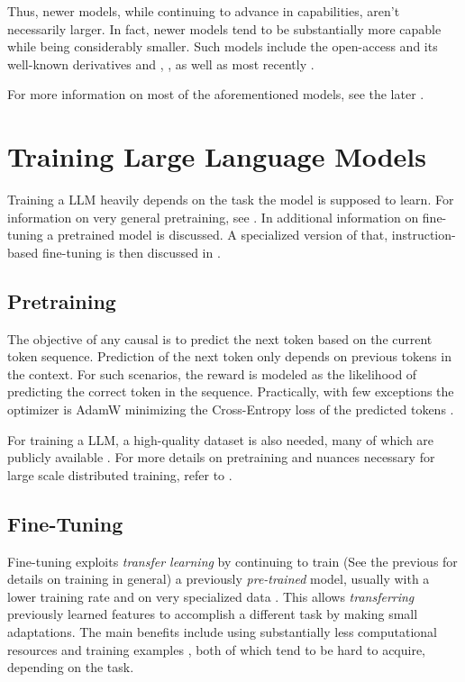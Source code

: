 Thus, newer models, while continuing to advance in capabilities, aren't necessarily larger.
In fact, newer models tend to be substantially more capable while being considerably smaller.
Such models include the open-access  and its well-known derivatives  and , , as well as most recently .

For more information on most of the aforementioned models, see the later .


\section{Training Large Language Models}\label{sec:training}
Training a \acrlong{LLM} heavily depends on the task the model is supposed to learn. For information on very general pretraining, see . In  additional information on fine-tuning a pretrained model is discussed. A specialized version of that, instruction-based fine-tuning is then discussed in .


\subsection{Pretraining}\label{sub:pretraining}
The objective of any \gls{causal} is to predict the next token based on the current token sequence.
Prediction of the next token only depends on previous tokens in the context.
For such scenarios, the reward is modeled as the likelihood of predicting the correct token in the sequence.
Practically, with few exceptions the optimizer is AdamW \cite{loshchilov_decoupled_2017} minimizing the Cross-Entropy loss of the predicted tokens \cite{naveed_comprehensive_2023}.

For training a \gls{LLM}, a high-quality dataset is also needed, many of which are publicly available \cite{redpajamadata_2023}.
For more details on pretraining and nuances necessary for large scale distributed training, refer to \cite{tirumala_d4_2023}.

\subsection{Fine-Tuning}\label{sub:finetune}
Fine-tuning exploits \textit{transfer learning} by continuing to train (See the previous  for details on training in general) a previously \textit{pre-trained} model, usually with a lower training rate and on very specialized data \cite{gaddipati_comparative_2020}.
This allows \textit{transferring} previously learned features to accomplish a different task by making small adaptations.
The main benefits include using substantially less computational resources and training examples \cite{gaddipati_comparative_2020}, both of which tend to be hard to acquire, depending on the task.

